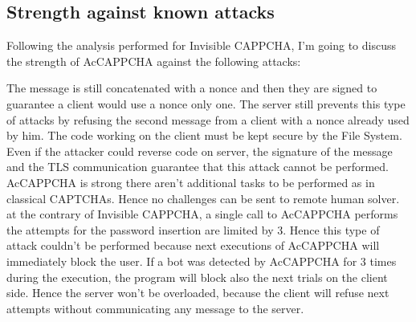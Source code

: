 \subsection{Strength against known attacks}\label{Results:attacks}
Following the analysis performed for Invisible CAPPCHA\cite{Invisible_CAPPCHA}, I'm going to discuss the strength of AcCAPPCHA against the following attacks:
\begin{itemize}
{The message is still concatenated with a nonce and then they are signed to guarantee a client would use a nonce only one. The server still prevents this type of attacks by refusing the second message from a client with a nonce already used by him.}
{The code working on the client must be kept secure by the File System. Even if the attacker could reverse code on server, the signature of the message and the TLS communication guarantee that this attack cannot be performed.}
{AcCAPPCHA is strong there aren't additional tasks to be performed as in classical CAPTCHAs. Hence no challenges can be sent to remote human solver.}
{at the contrary of Invisible CAPPCHA, a single call to AcCAPPCHA performs the attempts for the password insertion are limited by 3. Hence this type of attack couldn't be performed because next executions of AcCAPPCHA will immediately block the user.
}
{If a bot was detected by AcCAPPCHA for 3 times during the execution, the program will block also the next trials on the client side. Hence the server won't be overloaded, because the client will refuse next attempts without communicating any message to the server.}
\end{itemize}

